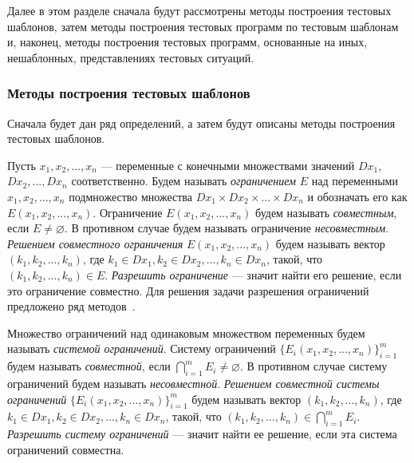 Далее в этом разделе сначала будут рассмотрены методы построения тестовых шаблонов, затем методы построения тестовых программ по тестовым шаблонам и, наконец, методы построения тестовых программ, основанные на иных, нешаблонных, представлениях тестовых ситуаций.


\subsubsection{Методы построения тестовых шаблонов}%

Сначала будет дан ряд определений, а затем будут описаны методы построения тестовых шаблонов.

Пусть $x_1, x_2, ..., x_n$ --- переменные с конечными множествами значений $Dx_1,$ $Dx_2, ..., Dx_n$ соответственно. Будем называть \emph{ограничением} $E$ над переменными $x_1, x_2, ..., x_n$ подмножество множества $Dx_1 \times Dx_2 \times ... \times Dx_n$ и обозначать его как $E(x_1, x_2, ..., x_n)$. Ограничение $E(x_1, x_2, ..., x_n)$ будем называть \emph{совместным}, если $E \neq \varnothing$. В противном случае будем называть ограничение \emph{несовместным}. \emph{Решением совместного ограничения} $E(x_1, x_2, ..., x_n)$ будем называть вектор $(k_1, k_2, ..., k_n)$, где $k_1 \in Dx_1, k_2 \in Dx_2, ..., k_n \in Dx_n$, такой, что $(k_1, k_2, ..., k_n) \in E$. \emph{Разрешить ограничение} --- значит найти его решение, если это ограничение совместно. Для решения задачи разрешения ограничений предложено ряд методов~\cite{CLPusingECLiPSe}.

Множество ограничений над одинаковым множеством переменных будем называть \emph{системой ограничений}. Систему ограничений $\{E_i(x_1, x_2, ..., x_n)\}_{i=1}^m$ будем называть \emph{совместной}, если $\bigcap_{i=1}^m E_i \neq \varnothing$. В противном случае систему ограничений будем называть \emph{несовместной}. \emph{Решением совместной системы ограничений} $\{E_i(x_1, x_2, ..., x_n)\}_{i=1}^m$ будем называть вектор $(k_1, k_2, ..., k_n)$, где $k_1 \in Dx_1, k_2 \in Dx_2, ..., k_n \in Dx_n$, такой, что $(k_1, k_2, ..., k_n) \in \bigcap_{i=1}^m E_i$. \emph{Разрешить систему ограничений} --- значит найти ее решение, если эта система ограничений совместна.

